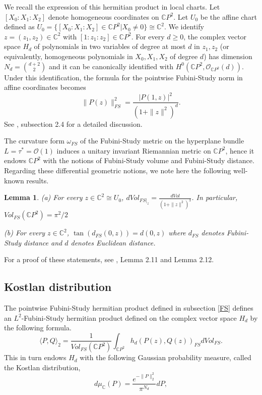 \documentclass [11pt]{amsart}
\newtheorem {lemma}[theorem]{Lemma}
\theoremstyle{remark}
\numberwithin{equation}{section}
\numberwithin{theorem}{section}
\begin{document}
We recall the expression of this hermitian product in local charts. Let $[X_{0}:X_{1}:X_{2}]$ denote homogeneous coordinates on $\mathbb{C}P^2$. Let $U_{0}$ be the affine chart defined as $U_{0}=\{[X_{0}:X_{1}:X_{2}]\in \mathbb{C}P^2 | X_{0}\neq 0 \}\cong\mathbb{C}^2$. We identify $z=(z_{1},z_{2})\in \mathbb{C}^2$ with $[1:z_{1}:z_{2}] \in \mathbb{C}P^2$. For every $d\geq 0$, the complex vector space $H_{d}$ of polynomials in two variables of degree at most $d$ in $z_{1}, z_{2}$ (or equivalently, homogeneous polynomials in $X_{0},X_{1},X_{2}$ of degree $d$) has dimension $\displaystyle{N_{d}={d+2 \choose 2}}$ and it can be canonically identified with $H^{0}(\mathbb{C}P^{2}, \mathcal{O}_{\mathbb{C}P^2}(d))$. Under this identification, the formula for the pointwise Fubini-Study norm in affine coordinates becomes 
\begin{equation} \label{pointwise} 
 \|P(z)\|^2_{FS} =     \frac{|P(1,z)|^2}{(1+\|z\|^2)^d}. 
 \end{equation}
See \cite{KW}, subsection 2.4 for a detailed discussion. 

The curvature form $\omega_{FS}$ of the Fubini-Study metric on the hyperplane bundle $L=\tau^{*}=\mathcal{O}(1)$ induces a unitary invariant Riemannian metric on $\mathbb{C}P^2$, hence it endows $\mathbb{C}P^2$ with the notions of Fubini-Study volume and Fubini-Study distance. Regarding these differential geometric notions, we note here the following well-known results.   

\begin{lemma} \label{FSdistance}
(a) For every $z\in \mathbb{C}^2 \cong U_{0}$, $\displaystyle{dVol_{FS|_{z}}=\frac{dVol}{(1+\|z\|^2)^3}}$. In particular, $\displaystyle{Vol_{FS}(\mathbb{C}P^2)=\pi^2/2}$

(b) For every $z\in \mathbb{C}^2$, $\tan(d_{FS}(0,z))=d(0,z)$ where $d_{FS}$ denotes Fubini-Study distance and $d$ denotes Euclidean distance. 
\end{lemma} 
For a proof of these statements, see \cite{KW}, Lemma 2.11 and Lemma 2.12. 

\subsection{Kostlan distribution} 

The pointwise Fubini-Study hermitian product defined in subsection \ref{FS} defines an $L^2$-Fubini-Study hermitian product defined on the complex vector space $H_{d}$ by the following formula. 
\begin{equation}\label{hermprod}
\langle P,Q\rangle_{2}=\frac{1}{Vol_{FS}(\mathbb{C}P^{2})}\int_{\mathbb{C}P^{2}} h_{d}(P(z),Q(z))_{FS} dVol_{FS}. 
\end{equation}  
This in turn endows $H_{d}$ with the following Gaussian probability measure, called the Kostlan distribution, 
\begin{equation*} \label{Kostlan} 
d\mu_{\mathbb{C}}(P)=\frac{e^{-\|P\|^2_{2}}}{\pi^{N_d}}dP, 
\end{equation*} 
\end{document}
